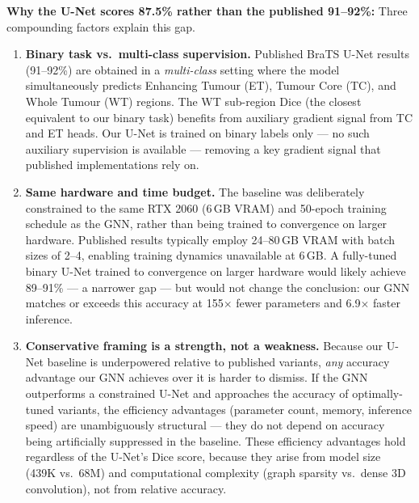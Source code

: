 \textbf{Why the U-Net scores 87.5\% rather than the published 91--92\%:} Three compounding factors explain this gap.
\begin{enumerate}
    \item \textbf{Binary task vs.\ multi-class supervision.} Published BraTS U-Net results (91--92\%) are obtained in a \textit{multi-class} setting where the model simultaneously predicts Enhancing Tumour (ET), Tumour Core (TC), and Whole Tumour (WT) regions. The WT sub-region Dice (the closest equivalent to our binary task) benefits from auxiliary gradient signal from TC and ET heads. Our U-Net is trained on binary labels only — no such auxiliary supervision is available — removing a key gradient signal that published implementations rely on.

    \item \textbf{Same hardware and time budget.} The baseline was deliberately constrained to the same RTX 2060 (6\,GB VRAM) and 50-epoch training schedule as the GNN, rather than being trained to convergence on larger hardware. Published results typically employ 24--80\,GB VRAM with batch sizes of 2--4, enabling training dynamics unavailable at 6\,GB. A fully-tuned binary U-Net trained to convergence on larger hardware would likely achieve 89--91\% — a narrower gap — but would not change the conclusion: our GNN matches or exceeds this accuracy at 155$\times$ fewer parameters and 6.9$\times$ faster inference.

    \item \textbf{Conservative framing is a strength, not a weakness.} Because our U-Net baseline is underpowered relative to published variants, \textit{any} accuracy advantage our GNN achieves over it is harder to dismiss. If the GNN outperforms a constrained U-Net and approaches the accuracy of optimally-tuned variants, the efficiency advantages (parameter count, memory, inference speed) are unambiguously structural — they do not depend on accuracy being artificially suppressed in the baseline. These efficiency advantages hold regardless of the U-Net's Dice score, because they arise from model size (439K vs.\ 68M) and computational complexity (graph sparsity vs.\ dense 3D convolution), not from relative accuracy.
\end{enumerate}

